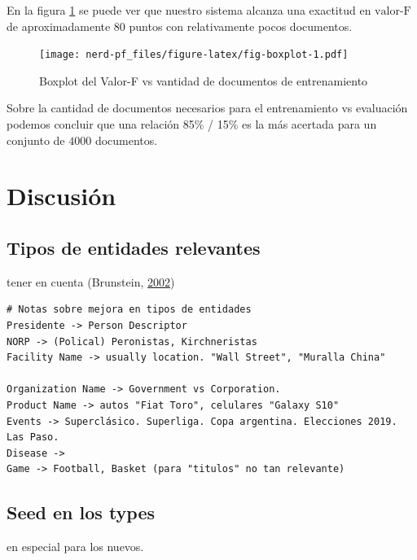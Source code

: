 \documentclass[12pt,a4paper,]{scrartcl}
\begin{document}
En la figura \ref{fig:fig-boxplot} se puede ver que nuestro sistema alcanza una exactitud en \(\text{valor-F}\) de aproximadamente 80 puntos con relativamente pocos documentos.

\begin{figure}[H]

{\centering \texttt{[image: nerd-pf\_files/figure-latex/fig-boxplot-1.pdf]} 

}

\caption{Boxplot del Valor-F vs vantidad de documentos de entrenamiento}\label{fig:fig-boxplot}
\end{figure}

Sobre la cantidad de documentos necesarios para el entrenamiento vs evaluación podemos concluir que una relación 85\% / 15\% es la más acertada para un conjunto de \(4000\) documentos.

\newpage

\hypertarget{discussion}{%
\section{Discusión}\label{discussion}}

\hypertarget{tipos-de-entidades-relevantes}{%
\subsection{Tipos de entidades relevantes}\label{tipos-de-entidades-relevantes}}

tener en cuenta (Brunstein, \protect\hyperlink{ref-brunstein2002}{2002})

\begin{verbatim}
# Notas sobre mejora en tipos de entidades
Presidente -> Person Descriptor
NORP -> (Polical) Peronistas, Kirchneristas
Facility Name -> usually location. "Wall Street", "Muralla China"

Organization Name -> Government vs Corporation.
Product Name -> autos "Fiat Toro", celulares "Galaxy S10"
Events -> Superclásico. Superliga. Copa argentina. Elecciones 2019. Las Paso.
Disease -> 
Game -> Football, Basket (para "titulos" no tan relevante)
\end{verbatim}

\hypertarget{seed-en-los-types}{%
\subsection{Seed en los types}\label{seed-en-los-types}}

en especial para los nuevos.
\end{document}
